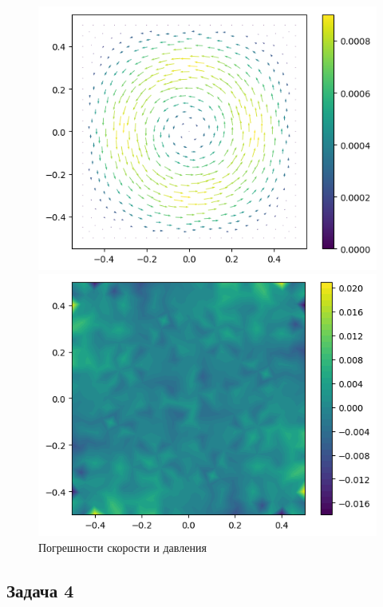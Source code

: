 \documentclass[a4paper,10pt]{report}
\begin{document}
\begin{figure}[H]
    \begin{minipage}{0.49\linewidth}
        \includegraphics[height=0.75\linewidth]{taylorvortex/eu.png}
    \end{minipage}
    \begin{minipage}{0.49\linewidth}
        \includegraphics[height=0.75\linewidth]{taylorvortex/ep.png}
    \end{minipage}
    \label{fig:taylorvortex-error}
    \caption{Погрешности скорости и давления}
\end{figure}


\subsection{Задача 4}
\end{document}
